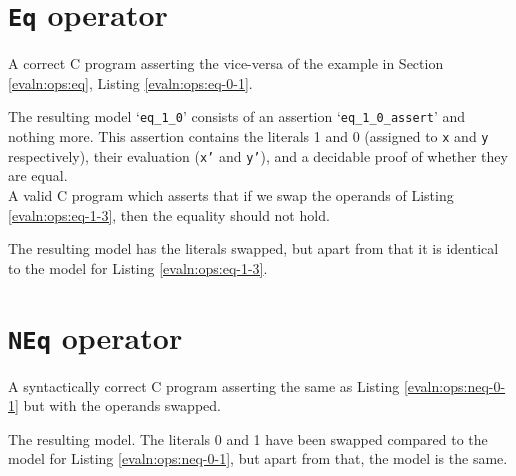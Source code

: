 \section{\texttt{Eq} operator}\label{app:evaln:ops:eq}
    
    
    A correct C program asserting the vice-versa of the example in Section \ref{evaln:ops:eq}, Listing \ref{evaln:ops:eq-0-1}.
    
    The resulting model `\texttt{eq\_1\_0}' consists of an assertion `\texttt{eq\_1\_0\_assert}' and nothing more. This assertion contains the literals 1 and 0 (assigned to \texttt{x} and \texttt{y} respectively), their evaluation (\texttt{x'} and \texttt{y'}), and a decidable proof of whether they are equal.
    \\
    
    
    
    A valid C program which asserts that if we swap the operands of Listing \ref{evaln:ops:eq-1-3}, then the equality should not hold.
    
    
    The resulting model has the literals swapped, but apart from that it is identical to the model for Listing \ref{evaln:ops:eq-1-3}.
    
    
\section{\texttt{NEq} operator}\label{app:evaln:ops:neq}
    
    
    A syntactically correct C program asserting the same as Listing \ref{evaln:ops:neq-0-1} but with the operands swapped.
    
    
    The resulting \Idris model. The literals 0 and 1 have been swapped compared to the model for Listing \ref{evaln:ops:neq-0-1}, but apart from that, the model is the same.
    \\
    
